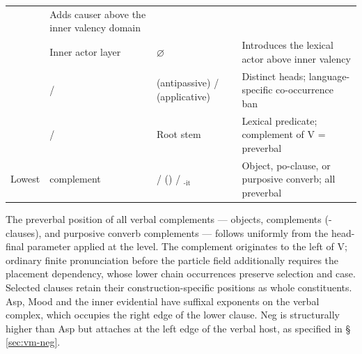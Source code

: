 \begin{table}[ht]
\begin{tabularx}{\textwidth}{l l l L}
    & Adds causer above the inner valency domain \\
    & Inner actor layer & $\varnothing$
    & Introduces the lexical actor above inner valency \\
    &  /  &  (antipassive) /  (applicative)
    & Distinct heads; language-specific co-occurrence ban \\
    & / & Root stem
    & Lexical predicate; complement of V = preverbal \\
    Lowest &  complement &  /  () / $_{\text{-it}}$
    & Object, po-clause, or purposive converb; all preverbal \\
    \bottomrule
  \end{tabularx}
\end{table}

\noindent The preverbal position of all verbal complements --- 
objects,  complements (-clauses), and purposive converb
complements --- follows uniformly from the head-final parameter applied at the
 level. The complement originates to the left of V; ordinary finite pronunciation
before the particle field additionally requires the placement dependency,
whose lower chain occurrences preserve selection and case. Selected clauses
retain their construction-specific positions as whole constituents.
Asp, Mood and the inner evidential have suffixal exponents on the verbal
complex, which occupies the right edge of the lower clause. Neg is structurally
higher than Asp but attaches at the left edge of the verbal host, as specified
in §\,\ref{sec:vm-neg}.

